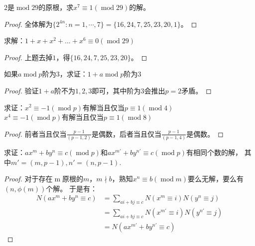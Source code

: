 \begin{exercise}
    $2$是$\operatorname{mod}29$的原根，求$x^7\equiv1(\operatorname{mod}29)$的解。
\end{exercise}
\begin{proof}
    全体解为$\{2^{4n}:n=1,\cdots,7\}=\{16,24,7,25,23,20,1\}$。
\end{proof}

\begin{exercise}
    求解：$1+x+x^2+\ldots+x^6\equiv0(\operatorname{mod}29)$
\end{exercise}
\begin{proof}
    上题去掉$1$，得$\{16,24,7,25,23,20\}$。
\end{proof}

\begin{exercise}
    如果$a\operatorname{mod}p$阶为$3$，求证：$1+a\operatorname{mod}p$阶为$3$
\end{exercise}
\begin{proof}
 验证$1+a$阶不为$1,2,3$即可，其中阶为$3$会推出$p=2$矛盾。
\end{proof}

\begin{exercise}
    求证：$x^2\equiv-1(\operatorname{mod}p)$有解当且仅当$p\equiv1(\operatorname{mod}4)$\\
    $x^4\equiv-1(\operatorname{mod}p)$有解当且仅当$p\equiv1(\operatorname{mod}8)$
\end{exercise}
\begin{proof}
    前者当且仅当$\frac{p-1}{(p-1,2)}$是偶数，后者当且仅当$\frac{p-1}{(p-1,4)}$是偶数。
\end{proof}

\begin{exercise}
    求证：$ax^m+by^n\equiv c(\operatorname{mod}p)$和$ax^{m'}+by^{n'}\equiv c(\operatorname{mod}p)$有相同个数的解，
    其中$m'=(m,p-1),n'=(n,p-1)$.
\end{exercise}
\begin{proof}
    对于存在$\operatorname{m}$原根的$m$，$m\nmid b$，熟知$x^n\equiv b(\operatorname{mod}m)$要么无解，要么有$(n,\phi(m))$个解。
    于是有：
    \begin{align*}
        N(ax^m+by^n\equiv c)
        &=\sum_{ai+bj\equiv c}N(x^m\equiv i)N(y^n\equiv j)\\
        &=\sum_{ai+bj\equiv c}N(x^{m'}\equiv i)N(y^{n'}\equiv j)\\
        &=N(ax^{m'}+by^{n'}\equiv c)
    \end{align*}
\end{proof}

